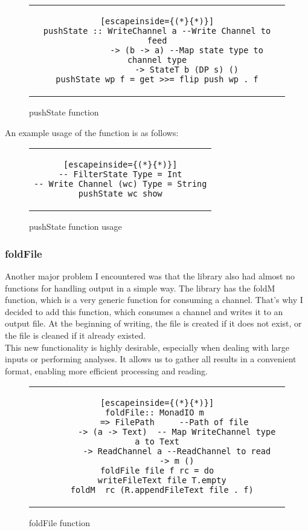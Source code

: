 \begin{figure}[H]
    \begin{tabular}{c}
        \begin{lstlisting}[escapeinside={(*}{*)}]
pushState :: WriteChannel a --Write Channel to feed
            -> (b -> a) --Map state type to channel type
            -> StateT b (DP s) ()
pushState wp f = get >>= flip push wp . f
        \end{lstlisting}
    \end{tabular}
    \caption{pushState function}
    \label{fig:HC23}
\end{figure}
An example usage of the function is as follows:

\begin{figure}[H]
    \begin{tabular}{c}
        \begin{lstlisting}[escapeinside={(*}{*)}]
-- FilterState Type = Int
-- Write Channel (wc) Type = String
pushState wc show
        \end{lstlisting}
    \end{tabular}
    \caption{pushState function usage}
    \label{fig:HC23b}
\end{figure}

\subsubsection*{foldFile}
Another major problem I encountered was that the library also had almost no functions for handling output in a simple way.
The library has the foldM function, which is a very generic function for consuming a channel.
That's why I decided to add this function, which consumes a channel and writes it to an output file.
At the beginning of writing, the file is created if it does not exist, or the file is cleaned if it already existed. \\

This new functionality is highly desirable, especially when dealing with large inputs or performing analyses.
It allows us to gather all results in a convenient format, enabling more efficient processing and reading.

\begin{figure}[H]
    \begin{tabular}{c}
        \begin{lstlisting}[escapeinside={(*}{*)}]
foldFile:: MonadIO m 
        => FilePath     --Path of file 
        -> (a -> Text)  -- Map WriteChannel type a to Text
        -> ReadChannel a --ReadChannel to read
        -> m ()
foldFile file f rc = do
  writeFileText file T.empty
  foldM_ rc (R.appendFileText file . f)
        \end{lstlisting}
    \end{tabular}
    \caption{foldFile function}
    \label{fig:HC24}
\end{figure}

